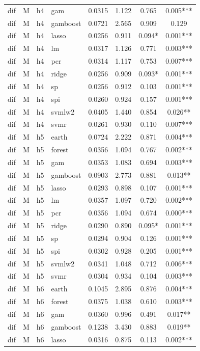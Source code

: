 \begin{ThreePartTable}
\begin{longtable}[t]{llclcccc}
dif & M & h4 & gam & 0.0315 & 1.122 & 0.765 & 0.005***\\
dif & M & h4 & gamboost & 0.0721 & 2.565 & 0.909 & 0.129\\
dif & M & h4 & lasso & 0.0256 & 0.911 & 0.094* & 0.001***\\
dif & M & h4 & lm & 0.0317 & 1.126 & 0.771 & 0.003***\\
dif & M & h4 & pcr & 0.0314 & 1.117 & 0.753 & 0.007***\\
dif & M & h4 & ridge & 0.0256 & 0.909 & 0.093* & 0.001***\\
dif & M & h4 & sp & 0.0256 & 0.912 & 0.103 & 0.001***\\
dif & M & h4 & spi & 0.0260 & 0.924 & 0.157 & 0.001***\\
dif & M & h4 & svmlw2 & 0.0405 & 1.440 & 0.854 & 0.026**\\
dif & M & h4 & svmr & 0.0261 & 0.930 & 0.110 & 0.007***\\
\addlinespace
dif & M & h5 & earth & 0.0724 & 2.222 & 0.871 & 0.004***\\
dif & M & h5 & forest & 0.0356 & 1.094 & 0.767 & 0.002***\\
dif & M & h5 & gam & 0.0353 & 1.083 & 0.694 & 0.003***\\
dif & M & h5 & gamboost & 0.0903 & 2.773 & 0.881 & 0.013**\\
dif & M & h5 & lasso & 0.0293 & 0.898 & 0.107 & 0.001***\\
dif & M & h5 & lm & 0.0357 & 1.097 & 0.720 & 0.002***\\
dif & M & h5 & pcr & 0.0356 & 1.094 & 0.674 & 0.000***\\
dif & M & h5 & ridge & 0.0290 & 0.890 & 0.095* & 0.001***\\
dif & M & h5 & sp & 0.0294 & 0.904 & 0.126 & 0.001***\\
dif & M & h5 & spi & 0.0302 & 0.928 & 0.205 & 0.001***\\
dif & M & h5 & svmlw2 & 0.0341 & 1.048 & 0.712 & 0.006***\\
dif & M & h5 & svmr & 0.0304 & 0.934 & 0.104 & 0.003***\\
\addlinespace
dif & M & h6 & earth & 0.1045 & 2.895 & 0.876 & 0.004***\\
dif & M & h6 & forest & 0.0375 & 1.038 & 0.610 & 0.003***\\
dif & M & h6 & gam & 0.0360 & 0.996 & 0.491 & 0.017**\\
dif & M & h6 & gamboost & 0.1238 & 3.430 & 0.883 & 0.019**\\
dif & M & h6 & lasso & 0.0316 & 0.875 & 0.113 & 0.002***\\

\end{longtable}
\end{ThreePartTable}
